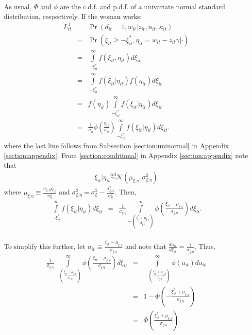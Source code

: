 \begin{exercise}
\noindent As usual, $\Phi$ and $\phi$ are the c.d.f. and p.d.f. of a univariate normal standard distribution, respectively. If the woman works: 
\begin{eqnarray}
L_{it}^1 &=& \Pr \left( d_{it} = 1 , w_{it} | z_{it}, n_{it}, \kappa_{it} \right) \nonumber \\
       &=& \Pr \left( \xi_{it} \geq - \xi_{it}^{*}, \eta_{it} = w_{it} - z_{it} \gamma | \cdot \right) \nonumber \nonumber \\
       &=& \int \limits _{-\xi_{it}^{*}} ^{\infty} f \left( \xi_{it}, \eta_{it} \right) d \xi_{it} \nonumber \\
       &=& \int \limits _{-\xi_{it}^{*}} ^{\infty} f \left( \xi_{it} | \eta_{it} \right) f \left( \eta_{it} \right) d \xi_{it} \nonumber \\
       &=& f \left( \eta_{it} \right) \int \limits _{-\xi_{it}^{*}} ^{\infty} f \left( \xi_{it} | \eta_{it} \right) d \xi_{it} \nonumber \\
       &=& \frac{1}{\sigma_{\eta}} \phi \left( \frac{\eta_{it}}{\sigma_{\eta}} \right) \int \limits _{-\xi_{it}^{*}} ^{\infty} f \left( \xi_{it} | \eta_{it} \right) d \xi_{it}.
\end{eqnarray}
\noindent where the last line follows from Subsection \ref{section:uninormal} in Appendix \ref{section:appendix}. From \ref{section:conditional} in Appendix \ref{section:appendix} note that
\begin{eqnarray}
\xi_{it} | \eta_{it} \overset{iid}{\sim} \mathcal{N} \left( \mu_{\xi.\eta}, \sigma_{\xi.\eta}^2 \right)
\end{eqnarray}
\noindent where $\mu_{\xi.\eta} \equiv \frac{\sigma_{\xi, \eta} \eta_{it}}{\sigma_{\eta}^2}$ and $\sigma_{\xi.\eta}^2 = \sigma_{\xi}^2 - \frac{\sigma_{\xi,\eta}^2}{\sigma_{\eta}^2}$. Then,
\begin{eqnarray}
\int \limits _{-\xi_{it}^{*}} ^{\infty} f \left( \xi_{it} | \eta_{it} \right) d \xi_{it} &=& \frac{1}{\sigma_{\xi.\eta}} \int \limits _{-  \left( \frac{\xi_{it}^{*} + \mu_{\xi.\eta}}{\sigma_{\xi.\eta}}  \right) } ^{\infty} \phi \left( \frac{\xi_{it} - \mu_{\xi.\eta}}{\sigma_{\xi.\eta}}  \right) d\xi_{it}. \nonumber \\
\end{eqnarray}

\noindent To simplify this further, let $u_{it} \equiv \frac{\xi_{it} - \mu_{\xi.\eta}}{\sigma_{\xi.\eta}}$ and note that $\frac{du_{it}}{d \xi_{it}} = \frac{1}{\sigma_{\xi.\eta}}$. Thus,
\begin{eqnarray}
\frac{1}{\sigma_{\xi.\eta}} \int \limits _{-  \left( \frac{\xi_{it}^{*} + \mu_{\xi.\eta}}{\sigma_{\xi.\eta}}  \right) } ^{\infty} \phi \left( \frac{\xi_{it} - \mu_{\xi.\eta}}{\sigma_{\xi.\eta}}  \right) d\xi_{it} &=& \int \limits _{-  \left( \frac{\xi_{it}^{*} + \mu_{\xi.\eta}}{\sigma_{\xi.\eta}}  \right) } ^{\infty} \phi (u_{it}) du_{it} \nonumber \\
&=& 1 - \Phi \left( -\frac{\xi_{it}^{*} + \mu_{\xi.\eta}}{\sigma_{\xi.\eta}} \right) \nonumber \\
&=& \Phi \left( \frac{\xi_{it}^{*} + \mu_{\xi.\eta}}{\sigma_{\xi.\eta}} \right).
\end{eqnarray}


\end{exercise}

